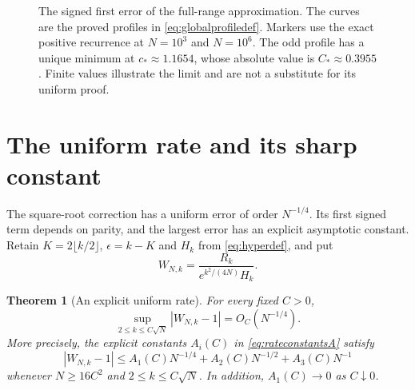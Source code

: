 \documentclass[11pt]{article}
\newtheorem{theorem}{Theorem}[section]
\theoremstyle{definition}
\theoremstyle{remark}
\newcommand{\1}{\mathbf 1}
\begin{document}
\begin{figure}[htbp]
\caption{The signed first error of the full-range approximation. The curves are the proved profiles in \eqref{eq:globalprofiledef}. Markers use the exact positive recurrence at $N=10^3$ and $N=10^6$. The odd profile has a unique minimum at $c_*\approx1.1654$, whose absolute value is $C_*\approx0.3955$. Finite values illustrate the limit and are not a substitute for its uniform proof.}
\label{fig:globalerror}
\end{figure}


\section{The uniform rate and its sharp constant}\label{sec:rates}

The square-root correction has a uniform error of order $N^{-1/4}$. Its first signed term depends on parity, and the largest error has an explicit asymptotic constant. Retain $K=2\lfloor k/2\rfloor$, $\epsilon=k-K$ and $H_k$ from \eqref{eq:hyperdef}, and put
\begin{equation}\label{eq:rateW}
W_{N,k}=\frac{R_k}{e^{k^2/(4N)}H_k}.
\end{equation}

\begin{theorem}[An explicit uniform rate]\label{thm:rate}
For every fixed $C>0$,
\begin{equation}\label{eq:uniformrate}
\sup_{2\le k\le C\sqrt N}|W_{N,k}-1|=O_C(N^{-1/4}).
\end{equation}
More precisely, the explicit constants $A_i(C)$ in \eqref{eq:rateconstantsA} satisfy
\begin{equation}\label{eq:ratefinite}
|W_{N,k}-1|
\le A_1(C)N^{-1/4}+A_2(C)N^{-1/2}+A_3(C)N^{-1}
\end{equation}
whenever $N\ge16C^2$ and $2\le k\le C\sqrt N$. In addition, $A_1(C)\to0$ as $C\downarrow0$.
\end{theorem}
\end{document}
